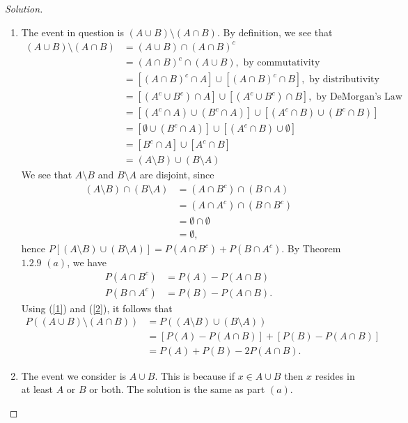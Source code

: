 \documentclass[12pt]{article}
\theoremstyle{definition}
\theoremstyle{plain}
\newenvironment{solution}
  {\begin{proof}[Solution]}
  {\end{proof}}
\begin{document}
\begin{enumerate}
\begin{solution}
\begin{enumerate}
	\item The event in question is $ (A \cup B) \setminus (A \cap B) $. By definition, we see that 
		\begin{align*}
			(A \cup B) \setminus (A \cap B) &= (A \cup B) \cap (A \cap B)^c\\
			&= (A \cap B)^c \cap (A \cup B), \text{ by commutativity}\\
			&= [ (A \cap B)^c \cap A] \cup [ (A \cap B)^c \cap B], \text{ by distributivity}\\
			&= [ (A^c \cup B^c) \cap A ] \cup [ (A^c \cup B^c) \cap B ], \text{ by DeMorgan's Law}\\
			&= [ (A^c \cap A) \cup (B^c \cap A) ] \cup [ (A^c \cap B) \cup (B^c \cap B) ] \\
			&= [ \emptyset \cup (B^c \cap A) ] \cup [ (A^c \cap B) \cup \emptyset ]\\
			&= [ B^c \cap A ] \cup [ A^c \cap B ]\\
			&= (A \setminus B) \cup (B \setminus A)
		\end{align*}
		We see that $ A \setminus B $ and $ B \setminus A $ are disjoint, since 
		\begin{align*}	
			(A \setminus B) \cap (B \setminus A) &= (A \cap B^c) \cap (B \cap A)\\
			&= (A \cap A^c) \cap (B \cap B^c)\\
			&= \emptyset \cap \emptyset\\
			&= \emptyset,
		\end{align*}
		hence $ P[ (A \setminus B) \cup (B \setminus A)] = P(A \cap B^c) + P(B \cap A^c) $. By Theorem $ 1.2.9 $ $(a)$, we have
		\begin{align}
			\label{1} P(A \cap B^c) &= P(A) - P(A \cap B)\\
			\label{2} P(B \cap A^c) &= P(B) - P(A \cap B).
		\end{align}
		Using (\ref{1}) and (\ref{2}), it follows that
		\begin{align*}
			P((A \cup B) \setminus (A \cap B)) &= P((A \setminus B) \cup (B \setminus A))\\
			&= [ P(A) - P(A \cap B) ] + [ P(B) - P(A \cap B)]\\
			&= P(A) + P(B) - 2 P(A \cap B).
		\end{align*}
		
	\item The event we consider is $ A \cup B $. This is because if $ x \in A \cup B $ then $ x $ resides in at least $ A $ or $ B $ or both. The solution is the same as part $ (a) $.
	 

\end{enumerate}
\end{solution}
\end{enumerate}
\end{document}
